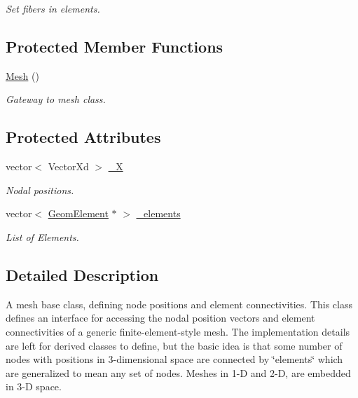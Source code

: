 \begin{DoxyCompactItemize}
\begin{DoxyCompactList}\small\item\em Set fibers in elements. \item\end{DoxyCompactList}\end{DoxyCompactItemize}
\subsection*{Protected Member Functions}
\begin{DoxyCompactItemize}
\item 
\hyperlink{classvoom_1_1_mesh_a6bb4b6118d3eeffcbea587aa8c533ac0}{Mesh} ()
\begin{DoxyCompactList}\small\item\em Gateway to mesh class. \item\end{DoxyCompactList}\end{DoxyCompactItemize}
\subsection*{Protected Attributes}
\begin{DoxyCompactItemize}
\item 
\hypertarget{classvoom_1_1_mesh_a1d13a8316f0939c287a6b8eced616fd3}{
vector$<$ VectorXd $>$ \hyperlink{classvoom_1_1_mesh_a1d13a8316f0939c287a6b8eced616fd3}{\_\-X}}
\label{classvoom_1_1_mesh_a1d13a8316f0939c287a6b8eced616fd3}

\begin{DoxyCompactList}\small\item\em Nodal positions. \item\end{DoxyCompactList}\item 
\hypertarget{classvoom_1_1_mesh_a4212ded8cfc10996d343d21734cbd6d4}{
vector$<$ \hyperlink{classvoom_1_1_geom_element}{GeomElement} $\ast$ $>$ \hyperlink{classvoom_1_1_mesh_a4212ded8cfc10996d343d21734cbd6d4}{\_\-elements}}
\label{classvoom_1_1_mesh_a4212ded8cfc10996d343d21734cbd6d4}

\begin{DoxyCompactList}\small\item\em List of Elements. \item\end{DoxyCompactList}\end{DoxyCompactItemize}


\subsection{Detailed Description}
A mesh base class, defining node positions and element connectivities. This class defines an interface for accessing the nodal position vectors and element connectivities of a generic finite-\/element-\/style mesh. The implementation details are left for derived classes to define, but the basic idea is that some number of nodes with positions in 3-\/dimensional space are connected by \char`\"{}elements\char`\"{} which are generalized to mean any set of nodes. Meshes in 1-\/D and 2-\/D, are embedded in 3-\/D space.

